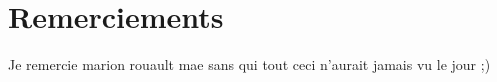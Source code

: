 \section*{Remerciements}

Je remercie marion  rouault mae sans qui tout ceci  n'aurait jamais vu
le jour ;)
\vspace{2cm}

